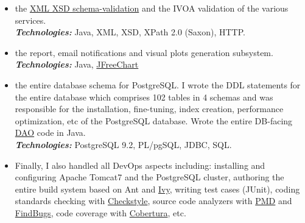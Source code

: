 \documentclass[10pt,a4paper]{article} %
\newcommand{\technologies}[0]{\textbf{\textit{Technologies:}}}
\begin{document}
{{{\begin{itemize}
    against the tool's \href{https://java.net/jira/browse/JAXB-965}{JIRA}). So I decided to implement
    my own \href{https://docs.oracle.com/javase/6/docs/technotes/tools/share/wsimport.html}{wsimport}-like tool that reads WSDL and generates Java code (stubs and skeletons) to perform SOAP calls.\\
    \technologies{} Java, SOAP (Jersey), XSD, template-based code generation with \href{http://www.stringtemplate.org/.}{String Template}
  \item the \href{https://en.wikipedia.org/wiki/XML_Schema_(W3C)}{XML XSD schema-validation}
    and the IVOA validation of the various services.
    \\
    \technologies{} Java, XML, XSD, XPath 2.0 (Saxon), HTTP.
  \item the report, email notifications and visual plots generation subsystem.
    \\
    \technologies{} Java, \href{http://www.jfree.org/jfreechart/}{JFreeChart}
    \item the entire database schema for PostgreSQL. I wrote the DDL statements for the entire database which comprises 102 tables in 4 schemas and was responsible for the installation, fine-tuning, index creation, performance optimization, etc of the PostgreSQL database. Wrote the entire DB-facing \href{https://en.wikipedia.org/wiki/Database_abstraction_layer}{DAO} code in Java.\\
      \technologies{} PostgreSQL 9.2, PL/pgSQL, JDBC, SQL.
    \item Finally, I also handled all DevOps aspects including: installing and configuring Apache Tomcat7 and the PostgreSQL cluster, authoring the entire build system based on
      Ant and \href{http://ant.apache.org/ivy/}{Ivy}, writing test cases (JUnit), coding standards checking with \href{http://checkstyle.sourceforge.net/}{Checkstyle}, source code analyzers with
      \href{https://pmd.github.io/}{PMD} and \href{http://findbugs.sourceforge.net/}{FindBugs},
      code coverage with \href{http://cobertura.github.io/cobertura/}{Cobertura}, etc.
  \end{itemize}

}}

}

\end{document}
